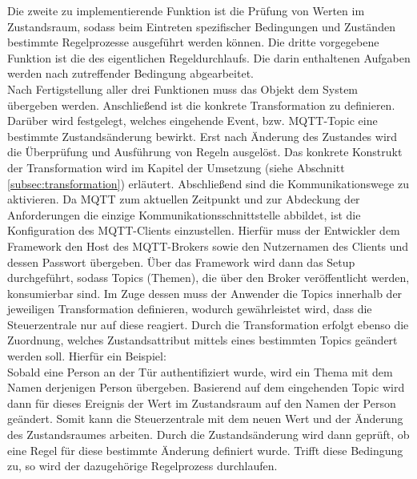         Die zweite zu implementierende Funktion ist die Prüfung von Werten im Zustandsraum, sodass beim Eintreten spezifischer 
        Bedingungen und Zuständen bestimmte Regelprozesse ausgeführt werden können. Die dritte vorgegebene Funktion ist die 
        des eigentlichen Regeldurchlaufs. Die darin enthaltenen Aufgaben werden nach zutreffender Bedingung abgearbeitet.
        \\
        Nach Fertigstellung aller drei Funktionen muss das Objekt dem System übergeben werden. Anschließend ist die 
        konkrete Transformation zu definieren. Darüber wird festgelegt, welches eingehende Event, bzw. \acs{MQTT}-Topic 
        eine bestimmte Zustandsänderung bewirkt. Erst nach Änderung des Zustandes wird die Überprüfung und Ausführung 
        von Regeln ausgelöst. Das konkrete Konstrukt der Transformation wird im Kapitel der Umsetzung (siehe Abschnitt \ref{subsec:transformation}) 
        erläutert. Abschließend sind die Kommunikationswege zu aktivieren. 
        Da \acs{MQTT} zum aktuellen Zeitpunkt und zur Abdeckung der Anforderungen die einzige Kommunikationsschnittstelle 
        abbildet, ist die Konfiguration des \acs{MQTT}-Clients einzustellen. Hierfür muss der Entwickler 
        dem Framework den Host des \acs{MQTT}-Brokers sowie den Nutzernamen des Clients und dessen Passwort übergeben. Über das 
        Framework wird dann das Setup durchgeführt, sodass Topics (Themen), die über den Broker veröffentlicht werden, konsumierbar 
        sind. Im Zuge dessen muss der Anwender die Topics innerhalb der jeweiligen Transformation definieren, wodurch gewährleistet wird, dass 
        die Steuerzentrale nur auf diese reagiert. Durch die Transformation erfolgt ebenso die 
        Zuordnung, welches Zustandsattribut mittels eines bestimmten Topics geändert werden soll. Hierfür ein Beispiel:  
        \\
        \linebreak
        Sobald eine Person an der Tür authentifiziert wurde, wird ein Thema mit dem Namen derjenigen Person übergeben. Basierend auf 
        dem eingehenden Topic wird dann für dieses Ereignis der Wert im Zustandsraum auf den Namen der Person geändert. Somit kann 
        die Steuerzentrale mit dem neuen Wert und der Änderung des Zustandsraumes arbeiten. Durch die Zustandsänderung wird dann 
        geprüft, ob eine Regel für diese bestimmte Änderung definiert wurde. Trifft diese Bedingung zu, so wird der dazugehörige Regelprozess 
        durchlaufen.  
        \\
        \linebreak

